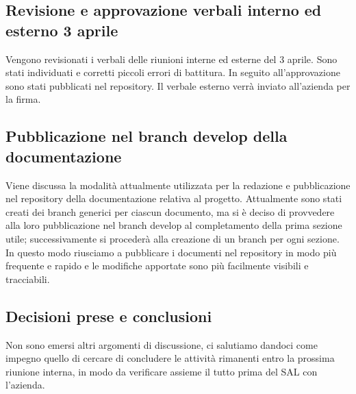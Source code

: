 \documentclass[italian,12pt]{article}
\begin{document}
\subsection{Revisione e approvazione verbali interno ed esterno 3 aprile}
Vengono revisionati i verbali delle riunioni interne ed esterne del 3 aprile. Sono stati individuati e corretti piccoli errori di battitura. In seguito all'approvazione sono stati pubblicati nel repository. Il verbale esterno verrà inviato all'azienda per la firma.

\subsection{Pubblicazione nel branch develop della documentazione}
Viene discussa la modalità attualmente utilizzata per la redazione e pubblicazione nel repository della documentazione relativa al progetto. Attualmente sono stati creati dei branch generici per ciascun documento, ma si è deciso di provvedere alla loro pubblicazione nel branch develop al completamento della prima sezione utile; successivamente si procederà alla creazione di un branch per ogni sezione. In questo modo riusciamo a pubblicare i documenti nel repository in modo più frequente e rapido e le modifiche apportate sono più facilmente visibili e tracciabili.

\subsection{Decisioni prese e conclusioni}
Non sono emersi altri argomenti di discussione, ci salutiamo dandoci come impegno quello di cercare di concludere le attività rimanenti entro la prossima riunione interna, in modo da verificare assieme il tutto prima del SAL con l'azienda.
\end{document}
